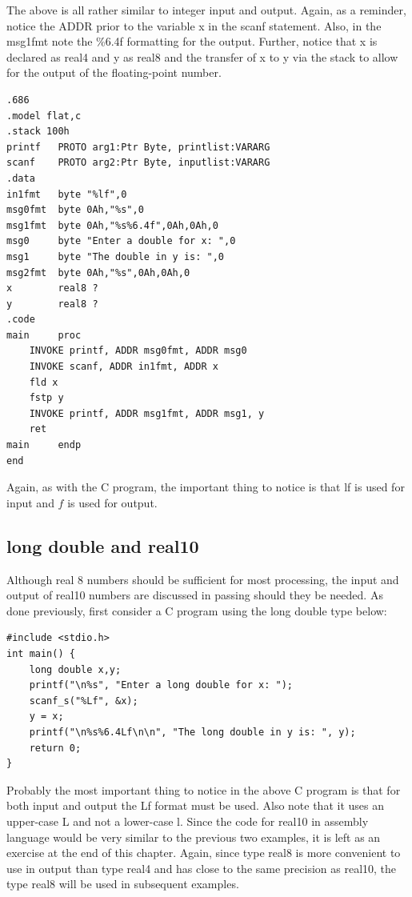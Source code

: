 \documentclass[10pt]{book}
\begin{document}
The above is all rather similar to integer input and output. Again, as a reminder, notice the ADDR prior to the variable x in the scanf statement. Also, in the msg1fmt note the \%6.4f formatting for the output. Further, notice that x is declared as real4 and y as real8 and the transfer of x to y via the stack to allow for the output of the floating-point number.
\begin{verbatim}
.686
.model flat,c
.stack 100h
printf   PROTO arg1:Ptr Byte, printlist:VARARG
scanf    PROTO arg2:Ptr Byte, inputlist:VARARG
.data
in1fmt   byte "%lf",0
msg0fmt  byte 0Ah,"%s",0
msg1fmt  byte 0Ah,"%s%6.4f",0Ah,0Ah,0
msg0     byte "Enter a double for x: ",0
msg1     byte "The double in y is: ",0
msg2fmt  byte 0Ah,"%s",0Ah,0Ah,0
x        real8 ?
y        real8 ?
.code
main     proc
    INVOKE printf, ADDR msg0fmt, ADDR msg0
    INVOKE scanf, ADDR in1fmt, ADDR x
    fld x
    fstp y
    INVOKE printf, ADDR msg1fmt, ADDR msg1, y
    ret
main     endp
end
\end{verbatim}

Again, as with the C program, the important thing to notice is that lf is used for input and $f$ is used for output.

\subsection{long double and real10}
Although real 8 numbers should be sufficient for most processing, the input and output of real10 numbers are discussed in passing should they be needed. As done previously, first consider a C program using the long double type below:

\begin{verbatim}
#include <stdio.h>
int main() {
    long double x,y;
    printf("\n%s", "Enter a long double for x: ");
    scanf_s("%Lf", &x);
    y = x;
    printf("\n%s%6.4Lf\n\n", "The long double in y is: ", y);
    return 0;
}
\end{verbatim}

Probably the most important thing to notice in the above C program is that for both input and output the Lf format must be used. Also note that it uses an upper-case L and not a lower-case l. Since the code for real10 in assembly language would be very similar to the previous two examples, it is left as an exercise at the end of this chapter. Again, since type real8 is more convenient to use in output than type real4 and has close to the same precision as real10, the type real8 will be used in subsequent examples.
\end{document}
